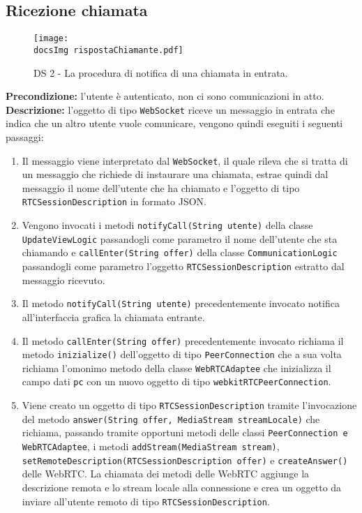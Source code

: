 \begin{sloppypar}
\subsection{Ricezione chiamata}
\begin{center}
				\begin{figure}[h!tbp]
					\centering
					\texttt{[image: \\docsImg  rispostaChiamante.pdf]}
				\caption{DS 2 - La procedura di notifica di una chiamata in entrata.}	
				\end{figure}
			\end{center}

\noindent \textbf{Precondizione: }l'utente è autenticato, non ci sono comunicazioni in atto.\\
\textbf{Descrizione: }l'oggetto di tipo \texttt{WebSocket} riceve un messaggio in entrata che indica che un altro utente vuole comunicare, vengono quindi eseguiti i seguenti passaggi:
\begin{enumerate}
	\item Il messaggio viene interpretato dal \texttt{WebSocket}, il quale rileva che si tratta di un messaggio che richiede di instaurare una chiamata, estrae quindi dal messaggio il nome dell'utente che ha chiamato e l'oggetto di tipo \texttt{RTCSessionDescription} in formato JSON\g .
	\item Vengono invocati i metodi \texttt{notifyCall(String utente)} della classe \texttt{UpdateViewLogic} passandogli come parametro il nome dell'utente che sta chiamando e \texttt{callEnter(String offer)} della classe \texttt{CommunicationLogic} passandogli come parametro l'oggetto \texttt{RTCSessionDescription} estratto dal messaggio ricevuto.
	\item Il metodo \texttt{notifyCall(String utente)} precedentemente invocato notifica all'interfaccia grafica la chiamata entrante.
	\item Il metodo \texttt{callEnter(String offer)} precedentemente invocato richiama il metodo \texttt{inizialize()} dell'oggetto di tipo \texttt{PeerConnection} che a sua volta richiama l'omonimo metodo della classe \texttt{WebRTCAdaptee} che inizializza il campo dati \texttt{pc} con un nuovo oggetto di tipo \texttt{webkitRTCPeerConnection}.
	\item Viene creato un oggetto di tipo \texttt{RTCSessionDescription} tramite l'invocazione del metodo \texttt{answer(String offer, MediaStream streamLocale)} che richiama, passando tramite opportuni metodi delle classi \texttt{PeerConnection e WebRTCAdaptee}, i metodi \texttt{addStream(MediaStream stream)}, \texttt{setRemoteDescription(RTCSessionDescription offer)} e \texttt{createAnswer()} delle WebRTC. La chiamata dei metodi delle WebRTC aggiunge la descrizione remota e lo stream locale alla connessione e crea un oggetto da inviare all'utente remoto di tipo \texttt{RTCSessionDescription}.

\end{enumerate}
\end{sloppypar}
